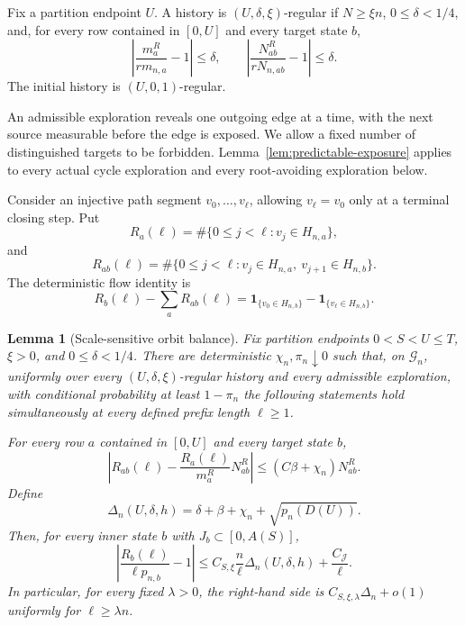 \documentclass[11pt]{article}
\newtheorem{lemma}[theorem]{Lemma}
\theoremstyle{definition}
\theoremstyle{remark}
\newcommand{\one}{\mathbf 1}
\newcommand{\cG}{\mathcal G}
\newcommand{\cJ}{\mathcal J}
\begin{document}
Fix a partition endpoint $U$.  A history is $(U,\delta,\xi)$-regular if
$N\ge\xi n$, $0\le\delta<1/4$, and, for every row contained in $[0,U]$ and
every target state $b$,
\begin{equation}
 \left|\frac{m_a^R}{r m_{n,a}}-1\right|\le\delta,
 \qquad
 \left|\frac{N_{ab}^R}{rN_{n,ab}}-1\right|\le\delta.
 \label{eq:regular-history}
\end{equation}
The initial history is $(U,0,1)$-regular.

An admissible exploration reveals one outgoing edge at a time, with the next
source measurable before the edge is exposed.  We allow a fixed number of
distinguished targets to be forbidden.  Lemma~\ref{lem:predictable-exposure}
applies to every actual cycle exploration and every root-avoiding exploration
below.

Consider an injective path segment $v_0,\ldots,v_\ell$, allowing
$v_\ell=v_0$ only at a terminal closing step.  Put
\[
 R_a(\ell)=\#\{0\le j<\ell:v_j\in H_{n,a}\},
\]
and
\[
 R_{ab}(\ell)=\#\{0\le j<\ell:
 v_j\in H_{n,a},\ v_{j+1}\in H_{n,b}\}.
\]
The deterministic flow identity is
\begin{equation}
 R_b(\ell)-\sum_aR_{ab}(\ell)
 =\one_{\{v_0\in H_{n,b}\}}-
  \one_{\{v_\ell\in H_{n,b}\}}.
 \label{eq:flow-identity}
\end{equation}

\begin{lemma}[Scale-sensitive orbit balance]
\label{lem:orbit-balance}
Fix partition endpoints $0<S<U\le T$, $\xi>0$, and
$0\le\delta<1/4$.  There are deterministic $\chi_n,\pi_n\downarrow0$ such
that, on $\cG_n$, uniformly over every $(U,\delta,\xi)$-regular history and
every admissible exploration, with conditional probability at least
$1-\pi_n$ the following statements hold simultaneously at every defined
prefix length $\ell\ge1$.

For every row $a$ contained in $[0,U]$ and every target state $b$,
\begin{equation}
 \left|R_{ab}(\ell)-\frac{R_a(\ell)}{m_a^R}N_{ab}^R\right|
 \le(C\beta+\chi_n)N_{ab}^R.
 \label{eq:row-prefix}
\end{equation}
Define
\begin{equation}
 \Delta_n(U,\delta,h)
 =\delta+\beta+\chi_n+\sqrt{p_n(D(U))}.
 \label{eq:Delta}
\end{equation}
Then, for every inner state $b$ with $J_b\subset[0,A(S)]$,
\begin{equation}
 \left|\frac{R_b(\ell)}{\ell p_{n,b}}-1\right|
 \le C_{S,\xi}\frac n\ell\Delta_n(U,\delta,h)
      +\frac{C_{\cJ}}\ell.
 \label{eq:scale-sensitive-balance}
\end{equation}
In particular, for every fixed $\lambda>0$, the right-hand side is
$C_{S,\xi,\lambda}\Delta_n+o(1)$ uniformly for $\ell\ge\lambda n$.
\end{lemma}
\end{document}
